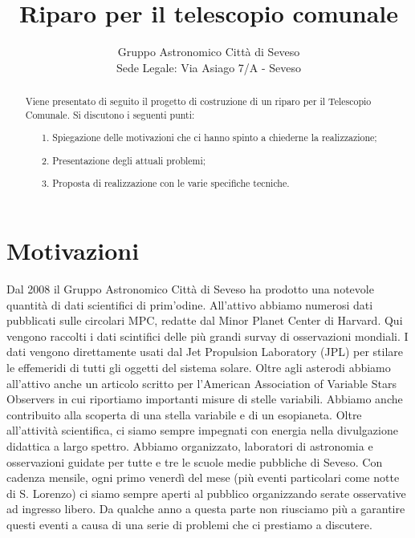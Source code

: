 \documentclass[a4paper,12pt]{article}
\begin{document}
\title{\bf \Huge Riparo per il telescopio comunale\\ }


\author{Gruppo Astronomico Città di Seveso\\
Sede Legale: Via Asiago 7/A - Seveso
}


\maketitle
\begin{abstract}
Viene presentato di seguito il progetto di costruzione di un riparo per il Telescopio Comunale. Si discutono i seguenti punti:
	\begin{itemize}
		\item[1.] Spiegazione delle motivazioni che ci hanno spinto a chiederne la realizzazione;
		\item[2.] Presentazione degli attuali problemi;
		\item[3.] Proposta di realizzazione con le varie specifiche tecniche.
	\end{itemize}
\end{abstract}

\section{Motivazioni}
Dal 2008 il Gruppo Astronomico Citt\`a di Seveso ha prodotto una notevole quantit\`a di dati scientifici di prim'odine. All'attivo abbiamo numerosi dati pubblicati sulle circolari MPC, redatte dal Minor Planet Center di Harvard. Qui vengono raccolti i dati scintifici delle pi\`u grandi survay di osservazioni mondiali. I dati vengono direttamente usati dal Jet Propulsion Laboratory (JPL) per stilare le effemeridi di tutti gli oggetti del sistema solare. Oltre agli asterodi abbiamo all'attivo anche un articolo scritto per l'American Association of Variable Stars Observers in cui riportiamo importanti misure di stelle variabili. Abbiamo anche contribuito alla scoperta di una stella variabile e di un esopianeta. Oltre all'attivit\`a scientifica, ci siamo sempre impegnati con energia nella divulgazione didattica a largo spettro. Abbiamo organizzato, laboratori di astronomia e osservazioni guidate per tutte e tre le scuole medie pubbliche di Seveso. Con cadenza mensile, ogni primo venerd\`i del mese (pi\`u eventi particolari come notte di S. Lorenzo) ci siamo sempre aperti al pubblico organizzando serate osservative ad ingresso libero. Da qualche anno a questa parte non riusciamo pi\`u a garantire questi eventi a causa di una serie di problemi che ci prestiamo a discutere.
\end{document}
